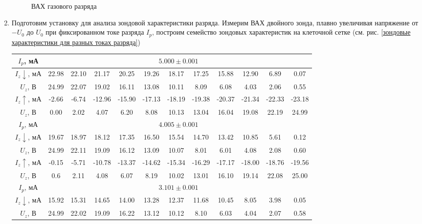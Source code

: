 \documentclass[a4paper, 12pt]{article}
\begin{document}
\begin{enumerate}
\begin{figure}[htbp]
        \caption{ВАХ газового разряда}
        \label{ВАХ газового разряда}
    \end{figure}
    \item Подготовим установку для анализа зондовой характеристики разряда. Измерим ВАХ двойного зонда, плавно увеличивая напряжение
    от $-U_{0}$ до $U_{0}$ при фиксированном токе разряда $I_{p}$, построим семейство зондовых характеристик на клеточной сетке (см. рис. \ref{зондовые характеристики для разных токах разряда})
    \begin{table}[htbp]
        \centering
        \begin{tabular}{|c|c|c|c|c|c|c|c|c|c|c|c|}
            \hline
            $I_{p}$, мА & \multicolumn{11}{|c|}{$5.000\pm 0.001$}\\ \hline
            $I_{z}\downarrow$, мА & 22.98 & 22.10 & 21.17 & 20.25 & 19.26 & 18.17 & 17.25 & 15.88 & 12.90 & 6.89 & 0.07\\ \hline
            $U_{z}$, В & 24.99 & 22.07 & 19.02 & 16.11 & 13.08 & 10.11 & 8.09 & 6.08 & 4.03 & 2.06 & 0.55\\ \hline
            $I_{z}\uparrow$, мА & -2.66 & -6.74 & -12.96 & -15.90 & -17.13 & -18.19 & -19.38 & -20.37 & -21.34 & -22.33 & -23.18\\ \hline
            $U_{z}$, В & 0.00 & 2.02 & 4.07 & 6.20 & 8.08 & 10.13 & 13.04 & 16.04 & 19.08 & 22.19 & 24.99\\ \hline
            $I_{p}$, мА & \multicolumn{11}{|c|}{$4.005\pm 0.001$}\\ \hline
            $I_{z}\downarrow$, мА & 19.67 & 18.97 & 18.12 & 17.35 & 16.50 & 15.54 & 14.70 & 13.42 & 10.85 & 5.61 & 0.12\\ \hline
            $U_{z}$, В & 24.99 & 22.11 & 19.09 & 16.12 & 13.09 & 10.07 & 8.01 & 6.01 & 4.08 & 2.08 & 0.60\\ \hline
            $I_{z}\uparrow$, мА & -0.15 & -5.71 & -10.78 & -13.37 & -14.62 & -15.34 & -16.29 & -17.17 & -18.00 & -18.76 & -19.56\\ \hline
            $U_{z}$, В & 0.6 & 2.11 & 4.08 & 6.07 & 8.19 & 10.02 & 13.01 & 16.10 & 19.14 & 22.08 & 25.00\\ \hline
            $I_{p}$, мА & \multicolumn{11}{|c|}{$3.101\pm 0.001$}\\ \hline
            $I_{z}\downarrow$, мА & 15.92 & 15.31 & 14.65 & 14.00 & 13.28 & 12.37 & 11.68 & 10.45 & 8.05 & 3.98 & 0.05\\ \hline
            $U_{z}$, В & 24.99 & 22.02 & 19.09 & 16.22 & 13.12 & 10.12 & 8.10 & 6.03 & 4.04 & 2.07 & 0.58\\ \hline

\end{tabular}
\end{table}
\end{enumerate}
\end{document}
